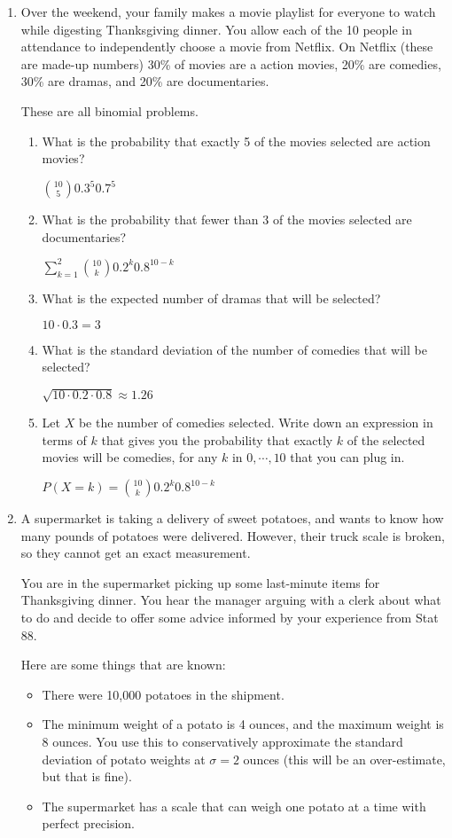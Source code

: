 \documentclass[11pt]{article}
\begin{document}
\begin{enumerate}
\item Over the weekend, your family makes a movie playlist for everyone to watch while digesting Thanksgiving dinner. You allow each of the 10 people in attendance to independently choose a movie from Netflix. On Netflix (these are made-up numbers) 30\% of movies are a action movies, 20\% are comedies, 30\% are dramas, and 20\% are documentaries.

{\color{red} These are all binomial problems.}

\begin{enumerate}
\item What is the probability that exactly 5 of the movies selected are action movies?

{\color{red}
${10 \choose 5}0.3^5 0.7^5$
}
\item What is the probability that fewer than 3 of the movies selected are documentaries?

{\color{red}
$\sum_{k=1}^2 {10 \choose k}0.2^k 0.8^{10-k}$
}
\item What is the expected number of dramas that will be selected?

{\color{red}
$10 \cdot 0.3 = 3$
}
\item What is the standard deviation of the number of comedies that will be selected?

{\color{red}
$\sqrt{10 \cdot 0.2 \cdot 0.8} \approx 1.26$
}
\item Let $X$ be the number of comedies selected. Write down an expression in terms of $k$ that gives you the probability that exactly $k$ of the selected movies will be comedies, for any $k$ in $0, \cdots, 10$ that you can plug in.

{\color{red}
$P(X = k) = {10 \choose k}0.2^k 0.8^{10-k}$
}
\end{enumerate}

\item A supermarket is taking a delivery of sweet potatoes, and wants to know how many pounds of potatoes were delivered. However, their truck scale is broken, so they cannot get an exact measurement.

You are in the supermarket picking up some last-minute items for Thanksgiving dinner. You hear the manager arguing with a clerk about what to do and decide to offer some advice informed by your experience from Stat 88.

Here are some things that are known:
\begin{itemize}
\item There were 10,000 potatoes in the shipment.
\item The minimum weight of a potato is 4 ounces, and the maximum weight is 8 ounces. You use this to conservatively approximate the standard deviation of potato weights at $\sigma = 2$ ounces (this will be an over-estimate, but that is fine).
\item The supermarket has a scale that can weigh one potato at a time with perfect precision.
\end{itemize}


\end{enumerate}
\end{document}
